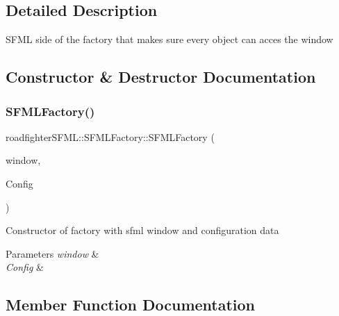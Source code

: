 \subsection{Detailed Description}
S\+F\+ML side of the factory that makes sure every object can acces the window 

\subsection{Constructor \& Destructor Documentation}
\mbox{\label{classroadfighterSFML_1_1SFMLFactory_af39bfa15dc13886b0fa9096baa273377}} 
\subsubsection{\texorpdfstring{S\+F\+M\+L\+Factory()}{SFMLFactory()}}
{\footnotesize\ttfamily roadfighter\+S\+F\+M\+L\+::\+S\+F\+M\+L\+Factory\+::\+S\+F\+M\+L\+Factory (\begin{DoxyParamCaption}\item[{std\+::shared\+\_\+ptr$<$ sf\+::\+Render\+Window $>$}]{window,  }\item[{std\+::shared\+\_\+ptr$<$ \hyperlink{classConfigData}{Config\+Data} $>$}]{Config }\end{DoxyParamCaption})}

Constructor of factory with sfml window and configuration data 
\begin{DoxyParams}{Parameters}
{\em window} & \\
\hline
{\em Config} & \\
\hline
\end{DoxyParams}


\subsection{Member Function Documentation}
\mbox{\label{classroadfighterSFML_1_1SFMLFactory_a977a002d878172e485bea8679c136d76}} 
